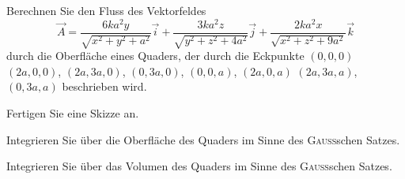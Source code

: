 \begin{atiTask}[
  title = Verifikation des GAUSSschen Satzes,
]

Berechnen Sie den Fluss des Vektorfeldes
\[
\vec{A}=\frac{6ka^2y}{\sqrt{x^2+y^2+a^2}}\vec{i} +\frac{3ka^2z}{\sqrt{y^2+z^2+4a^2}}\vec{j}+\frac{2ka^2x}{\sqrt{x^2+z^2+9a^2}}\vec{k}
\]
durch die Oberfläche eines Quaders, der durch die Eckpunkte $(0,0,0)$ $(2a,0,0)$, $(2a,3a,0)$, $(0,3a,0)$, $(0,0,a)$, $(2a,0,a)$ $(2a,3a,a)$, $(0,3a,a)$ beschrieben wird.
\begin{atiSubtasks}
\item Fertigen Sie eine Skizze an.
\item Integrieren Sie über die Oberfläche des Quaders im Sinne des \textsc{Gauss}schen Satzes.
\item Integrieren Sie über das Volumen des Quaders im Sinne des \textsc{Gauss}schen Satzes.
\end{atiSubtasks}

\end{atiTask}

\begin{atiSolution}

\end{atiSolution}
